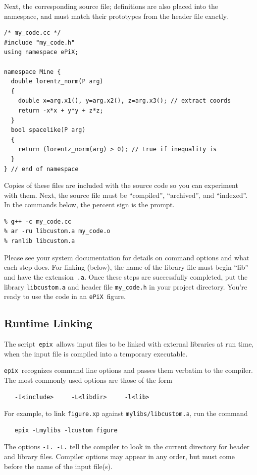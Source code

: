 \documentclass[12pt]{report}
\newcommand{\code}[1]{\texttt{#1}}
\newcommand{\filename}[1]{\texttt{#1}}
\newcommand{\ePiX}{\code{ePiX}}
\newcommand{\epix}{\code{epix}}
\begin{document}
Next, the corresponding source file; definitions are also placed into
the namespace, and must match their prototypes from the header file
exactly.
\begin{verbatim}
/* my_code.cc */
#include "my_code.h"
using namespace ePiX;

namespace Mine {
  double lorentz_norm(P arg)
  {
    double x=arg.x1(), y=arg.x2(), z=arg.x3(); // extract coords
    return -x*x + y*y + z*z;
  }
  bool spacelike(P arg)
  {
    return (lorentz_norm(arg) > 0); // true if inequality is
  }
} // end of namespace
\end{verbatim}
Copies of these files are included with the source code so you can
experiment with them. Next, the source file must be ``compiled'',
``archived'', and ``indexed''. In the commands below, the percent sign
is the prompt.
\begin{verbatim}
% g++ -c my_code.cc
% ar -ru libcustom.a my_code.o
% ranlib libcustom.a
\end{verbatim}
Please see your system documentation for details on command options
and what each step does. For linking (below), the name of the library
file must begin ``lib'' and have the extension~\filename{.a}. Once these
steps are successfully completed, put the library \filename{libcustom.a}
and header file \filename{my\_code.h} in your project directory. You're
ready to use the code in an \ePiX\ figure.


\subsection*{Runtime Linking}

The script~\epix\ allows input files to be linked with external
libraries at run time, when the input file is compiled into a
temporary executable.

\epix\ recognizes command line options and passes them verbatim to the
compiler. The most commonly used options are those of the form
\begin{verbatim}
   -I<include>     -L<libdir>     -l<lib>
\end{verbatim}
For example, to link \filename{figure.xp} against
\filename{mylibs/libcustom.a}, run the command
\begin{verbatim}
   epix -Lmylibs -lcustom figure
\end{verbatim}
The options \code{-I. -L.} tell the compiler to look in the current
directory for header and library files.  Compiler options may appear
in any order, but must come before the name of the input file(s).
\end{document}
